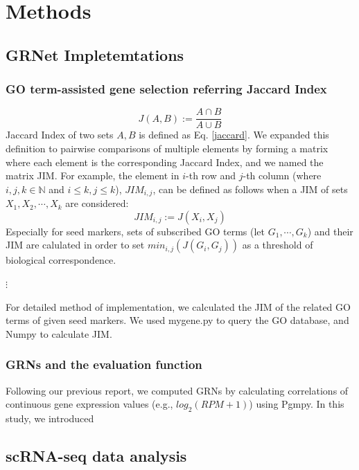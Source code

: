 \documentclass{article}
\begin{document}
\section*{Methods}
\subsection*{GRNet Impletemtations}

\subsubsection*{GO term-assisted gene selection referring Jaccard Index}
\begin{equation}\label{jaccard}
  J(A, B) := \frac{A\cap B}{A\cup B}
\end{equation}
Jaccard Index of two sets $A, B$ is defined as Eq. \eqref{jaccard}. We expanded this 
definition to pairwise comparisons of multiple elements by forming a matrix 
where each element is the corresponding Jaccard Index, and we named the matrix \ac{JIM}. For example, the element in 
$i$-th row and $j$-th column (where $i, j, k\in\mathbb{N}$ and $i\leq k, j\leq k$), $JIM_{i,j}$, can be defined as
follows when a JIM of sets $X_1, X_2,\cdots, X_k$ are considered:
\begin{equation}\label{jim}
  JIM_{i, j} := J(X_i, X_j)
\end{equation}
Especially for seed markers, sets of subscribed GO terms (let $G_1, \cdots, G_k$)
and their JIM are calulated in order to set $min_{i,j}(J(G_i, G_j))$ as a threshold of 
biological correspondence.

$\vdots$

For detailed method of implementation, we calculated the JIM of the related GO terms of given seed markers. We used mygene.py\cite{mygene} to query the GO database, and Numpy\cite{numpy} to calculate JIM.

\subsubsection*{GRNs and the evaluation function}
Following our previous report\cite{okano2023set}, we computed GRNs by calculating
correlations of continuous gene expression values (e.g., $log_2(RPM+1)$) using Pgmpy\cite{pgmpy}. In this study, we introduced

\subsection*{scRNA-seq data analysis}
\end{document}
